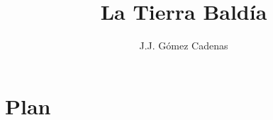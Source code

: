 \documentclass[12pt,a4paper]{book}
\title{La Tierra Baldía}
\author{J.J. Gómez Cadenas}
\begin{document}
\maketitle
\tableofcontents

\chapter{Plan}

 
\end{document}
